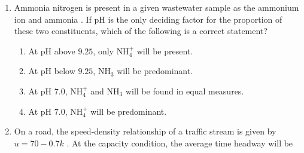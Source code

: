\documentclass[journal,12pt,onecolumn]{article}
\theoremstyle{remark}
\begin{document}
\begin{enumerate}
\hfill{}
\begin{enumerate}
\end{enumerate}

\item Ammonia nitrogen is present in a given wastewater sample as the ammonium ion  and ammonia . If pH is the only deciding factor for the proportion of these two constituents, which of the following is a correct statement?

\hfill{}
\begin{enumerate}
    \item At pH above $9.25$, only $\text{NH}_4^+$ will be present.
    \item At pH below $9.25$, $\text{NH}_3$ will be predominant.
    \item At pH $7.0$, $\text{NH}_4^+$ and $\text{NH}_3$ will be found in equal measures.
    \item At pH $7.0$, $\text{NH}_4^+$ will be predominant.
\end{enumerate}

\item On a road, the speed-density relationship of a traffic stream is given by $u = 70-0.7k$ . At the capacity condition, the average time headway will be

\hfill{}
\begin{enumerate}
\end{enumerate}


\end{enumerate}
\end{document}
